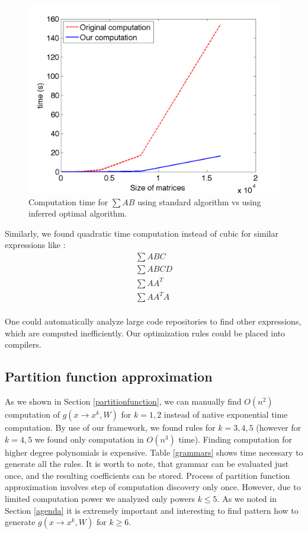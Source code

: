 \documentclass{article}
\begin{document}
\begin{figure}[h]
\centering
\includegraphics[scale=0.3]{img/ab.png}
\caption{Computation time for $\sum AB$ using standard algorithm vs using inferred optimal algorithm.}
\label{ab}
\end{figure}


Similarly, we found quadratic time computation instead of cubic for similar expressions like : 
\begin{align*}
	\sum ABC\\
	\sum ABCD\\
	\sum AA^T\\
	\sum AA^TA\\
\end{align*}

One could automatically analyze large code repositories to find other expressions, which are computed inefficiently. 
Our optimization rules could be placed into compilers.

\subsection{Partition function approximation}

As we shown in Section \ref{partitionfunction}, we can manually find $O(n^2)$ computation of $g(x \rightarrow x^k, W)$ for $k = 1, 2$ 
instead of native exponential time computation. By use of
our framework, we found rules for $k = 3, 4, 5$ (however for $k = 4, 5$ we found only computation in $O(n^3)$ time). 
Finding computation for higher degree polynomials is expensive.
Table \ref{grammars} shows time necessary to
generate all the rules. It is worth to note, that grammar can be evaluated just once, and the resulting coefficients can 
be stored. Process of partition function approximation involves step of computation discovery only once. However, due to limited computation power
we analyzed only powers $k \leq 5$. As we noted in Section \ref{agenda}
it is extremely important and interesting to find pattern how to generate $g(x \rightarrow x^k, W)$ for $k \geq 6$.
\end{document}
